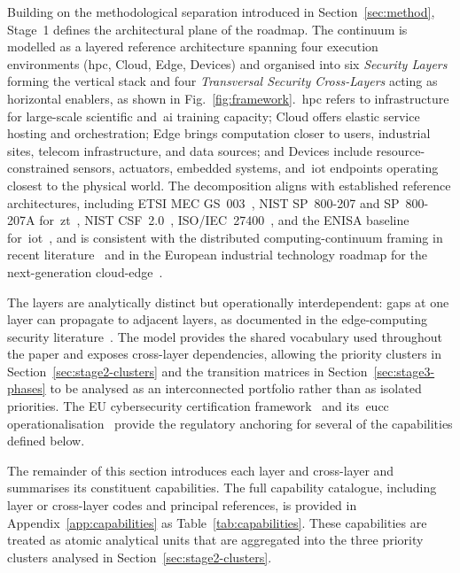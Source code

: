 \documentclass{ieeeaccess}
\begin{document}
Building on the methodological separation introduced in Section~\ref{sec:method}, Stage~1 defines the architectural plane of the roadmap. The continuum is modelled as a layered reference architecture spanning four execution environments (\gls{hpc}, Cloud, Edge, Devices) and organised into six \textit{Security Layers} forming the vertical stack and four \textit{Transversal Security Cross-Layers} acting as horizontal enablers, as shown in Fig.~\ref{fig:framework}.~\gls{hpc} refers to infrastructure for large-scale scientific and~\gls{ai} training capacity; Cloud offers elastic service hosting and orchestration; Edge brings computation closer to users, industrial sites, telecom infrastructure, and data sources; and Devices include resource-constrained sensors, actuators, embedded systems, and~\gls{iot} endpoints operating closest to the physical world. The decomposition aligns with established reference architectures, including ETSI MEC GS~003~\cite{etsimec003}, NIST SP~800-207 and SP~800-207A for~\gls{zt}~\cite{rose2020zta,chandramouli2023zta}, NIST CSF~2.0~\cite{nistcsf2}, ISO/IEC~27400~\cite{iso27400}, and the ENISA baseline for~\gls{iot}~\cite{enisa2017iot}, and is consistent with the distributed computing-continuum framing in recent literature~\cite{dustdar2023,bittencourt2018} and in the European industrial technology roadmap for the next-generation cloud-edge~\cite{ecroadmap2024}.

The layers are analytically distinct but operationally interdependent: gaps at one layer can propagate to adjacent layers, as documented in the edge-computing security literature~\cite{alwarafy2021,ranaweera2021,roman2018}. The model provides the shared vocabulary used throughout the paper and exposes cross-layer dependencies, allowing the priority clusters in Section~\ref{sec:stage2-clusters} and the transition matrices in Section~\ref{sec:stage3-phases} to be analysed as an interconnected portfolio rather than as isolated priorities. The EU cybersecurity certification framework~\cite{eucsa} and its~\gls{eucc} operationalisation~\cite{commreg2024eucc} provide the regulatory anchoring for several of the capabilities defined below.

The remainder of this section introduces each layer and cross-layer and summarises its constituent capabilities. The full capability catalogue, including layer or cross-layer codes and principal references, is provided in Appendix~\ref{app:capabilities} as Table~\ref{tab:capabilities}. These capabilities are treated as atomic analytical units that are aggregated into the three priority clusters analysed in Section~\ref{sec:stage2-clusters}.
\end{document}

